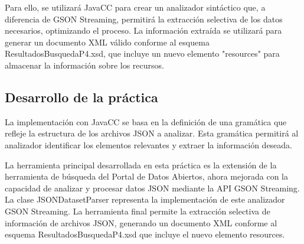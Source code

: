 

Para ello, se utilizará JavaCC para crear un analizador sintáctico que, a diferencia de GSON Streaming, permitirá la extracción selectiva de los datos necesarios, optimizando el proceso. La información extraída se utilizará para generar un documento XML válido conforme al esquema ResultadosBusquedaP4.xsd, que incluye un nuevo elemento "resources" para almacenar la información sobre los recursos.

\subsection{Desarrollo de la práctica}

La implementación con JavaCC se basa en la definición de una gramática que refleje la estructura de los archivos JSON a analizar. Esta gramática permitirá al analizador identificar los elementos relevantes y extraer la información deseada.






\noindent La herramienta principal desarrollada en esta práctica es la extensión de la herramienta de búsqueda del Portal de Datos Abiertos, ahora mejorada con la capacidad de analizar y procesar datos JSON mediante la API GSON Streaming. La clase JSONDatasetParser representa la implementación de este analizador GSON Streaming. La herramienta final permite la extracción selectiva de información de archivos JSON, generando un documento XML conforme al esquema ResultadosBusquedaP4.xsd que incluye el nuevo elemento resources.

